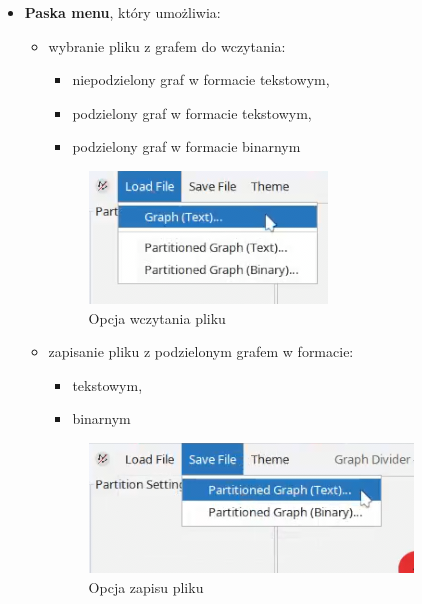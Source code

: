 \documentclass{article}
\begin{document}
    \begin{itemize}
    
        \item \textbf{Paska menu}, który umożliwia:
        \begin{itemize}
            \item wybranie pliku z grafem do wczytania:
            \begin{itemize}
                \item niepodzielony graf w formacie tekstowym,
                \item podzielony graf w formacie tekstowym,
                \item podzielony graf w formacie binarnym
            \end{itemize}
            \begin{figure}[H]
                \centering
                \includegraphics[width=0.5\linewidth]{img/load_file.png}
                \caption{Opcja wczytania pliku}
                \label{fig:load_file}
            \end{figure}
            
            \item zapisanie pliku z podzielonym grafem w formacie:
            \begin{itemize}
                \item tekstowym,
                \item binarnym
            \end{itemize}
            \begin{figure}[H]
                \centering
                \includegraphics[width=0.5\linewidth]{img/save_file.png}
                \caption{Opcja zapisu pliku}
                \label{fig:save_file}
            \end{figure}
            

\end{itemize}
\end{itemize}
\end{document}
